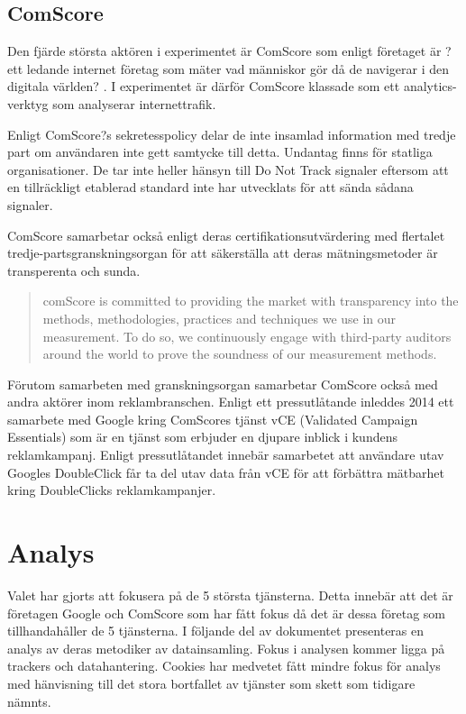 \documentclass[a4paper,11pt]{article}
\begin{document}
{\subsection{ComScore}
Den fjärde största aktören i experimentet är ComScore som enligt företaget är ?ett ledande internet företag som mäter vad människor gör då de navigerar i den digitala världen? \cite{ComScoreAnalytics}. I experimentet är därför ComScore klassade som ett analytics-verktyg som analyserar internettrafik.

Enligt ComScore?s sekretesspolicy \cite{ComScorePrivacy} delar de inte insamlad information med tredje part om användaren inte gett samtycke till detta. Undantag finns för statliga organisationer. De tar inte heller hänsyn till Do Not Track signaler eftersom att en tillräckligt etablerad standard inte har utvecklats för att sända sådana signaler. 

ComScore samarbetar också enligt deras certifikationsutvärdering \cite{ComScoreThirdParty} med flertalet tredje-partsgranskningsorgan för att  säkerställa att deras mätningsmetoder är transperenta och sunda. 

\begin{quote}
comScore is committed to providing the market with transparency into the methods, methodologies, practices and techniques we use in our measurement. To do so, we continuously engage with third-party auditors around the world to prove the soundness of our measurement methods. \cite{ComScoreThirdParty}
\end{quote}

Förutom samarbeten med granskningsorgan samarbetar ComScore också med andra aktörer inom reklambranschen. Enligt ett pressutlåtande \cite{ComScorePartner} inleddes 2014 ett samarbete med Google kring ComScores tjänst vCE (Validated Campaign Essentials) som är en tjänst som erbjuder en djupare inblick i kundens reklamkampanj. Enligt pressutlåtandet  innebär samarbetet att användare utav Googles DoubleClick får ta del utav data från vCE för att förbättra mätbarhet kring DoubleClicks reklamkampanjer.

\section{Analys}
Valet har gjorts att fokusera på de 5 största tjänsterna. Detta innebär att det är företagen Google och ComScore som har fått fokus då det är dessa företag som tillhandahåller de 5 tjänsterna. I följande del av dokumentet presenteras en analys av deras metodiker av datainsamling. Fokus i analysen kommer ligga på trackers och datahantering. Cookies har medvetet fått mindre fokus för analys med hänvisning till det stora bortfallet av tjänster som skett som tidigare nämnts.


}
\end{document}
